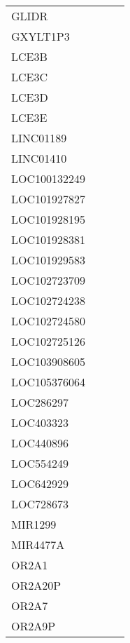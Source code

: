 \begin{tabular}{lccc}
GLIDR              &     &     &         \\
GXYLT1P3           &     &     &         \\
LCE3B              &     &     &         \\
LCE3C              &     &     &         \\
LCE3D              &     &     &         \\
LCE3E              &     &     &         \\
LINC01189          &     &     &         \\
LINC01410          &     &     &         \\
LOC100132249       &     &     &         \\
LOC101927827       &     &     &         \\
LOC101928195       &     &     &         \\
LOC101928381       &     &     &         \\
LOC101929583       &     &     &         \\
LOC102723709       &     &     &         \\
LOC102724238       &     &     &         \\
LOC102724580       &     &     &         \\
LOC102725126       &     &     &         \\
LOC103908605       &     &     &         \\
LOC105376064       &     &     &         \\
LOC286297          &     &     &         \\
LOC403323          &     &     &         \\
LOC440896          &     &     &         \\
LOC554249          &     &     &         \\
LOC642929          &     &     &         \\
LOC728673          &     &     &         \\
MIR1299            &     &     &         \\
MIR4477A           &     &     &         \\
OR2A1              &     &     &         \\
OR2A20P            &     &     &         \\
OR2A7              &     &     &         \\
OR2A9P             &     &     &         \\

\end{tabular}
